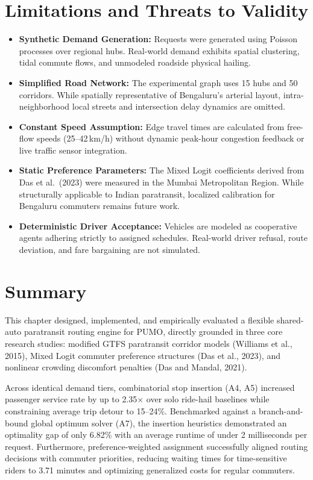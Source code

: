 \section{Limitations and Threats to Validity}
\begin{itemize}
\item \textbf{Synthetic Demand Generation:} Requests were generated using Poisson processes over regional hubs. Real-world demand exhibits spatial clustering, tidal commute flows, and unmodeled roadside physical hailing.
\item \textbf{Simplified Road Network:} The experimental graph uses 15 hubs and 50 corridors. While spatially representative of Bengaluru's arterial layout, intra-neighborhood local streets and intersection delay dynamics are omitted.
\item \textbf{Constant Speed Assumption:} Edge travel times are calculated from free-flow speeds (25--42\,km/h) without dynamic peak-hour congestion feedback or live traffic sensor integration.
\item \textbf{Static Preference Parameters:} The Mixed Logit coefficients derived from Das et al.\ (2023) were measured in the Mumbai Metropolitan Region. While structurally applicable to Indian paratransit, localized calibration for Bengaluru commuters remains future work.
\item \textbf{Deterministic Driver Acceptance:} Vehicles are modeled as cooperative agents adhering strictly to assigned schedules. Real-world driver refusal, route deviation, and fare bargaining are not simulated.
\end{itemize}

\section{Summary}
This chapter designed, implemented, and empirically evaluated a flexible shared-auto paratransit routing engine for PUMO, directly grounded in three core research studies: modified GTFS paratransit corridor models (Williams et al., 2015), Mixed Logit commuter preference structures (Das et al., 2023), and nonlinear crowding discomfort penalties (Das and Mandal, 2021).

Across identical demand tiers, combinatorial stop insertion (A4, A5) increased passenger service rate by up to 2.35$\times$ over solo ride-hail baselines while constraining average trip detour to 15--24\%. Benchmarked against a branch-and-bound global optimum solver (A7), the insertion heuristics demonstrated an optimality gap of only 6.82\% with an average runtime of under 2 milliseconds per request. Furthermore, preference-weighted assignment successfully aligned routing decisions with commuter priorities, reducing waiting times for time-sensitive riders to 3.71 minutes and optimizing generalized costs for regular commuters.
